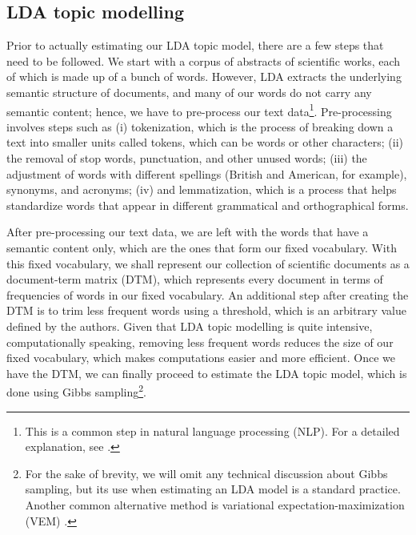 \subsection{LDA topic modelling} \label{topic_modelling}

Prior to actually estimating our LDA topic model, there are a few steps that need to be followed. We start with a corpus of abstracts of scientific works, each of which is made up of a bunch of words. However, LDA extracts the underlying semantic structure of documents, and many of our words do not carry any semantic content; hence, we have to pre-process our text data\footnote{This is a common step in natural language processing (NLP). For a detailed explanation, see \cite[p. 9-12]{ponweiser_latent_2012}.}. Pre-processing involves steps such as (i) tokenization, which is the process of breaking down a text into smaller units called tokens, which can be words or other characters; (ii) the removal of stop words, punctuation, and other unused words; (iii) the adjustment of words with different spellings (British and American, for example), synonyms, and acronyms; (iv) and lemmatization, which is a process that helps standardize words that appear in different grammatical and orthographical forms. 

After pre-processing our text data, we are left with the words that have a semantic content only, which are the ones that form our fixed vocabulary. With this fixed vocabulary, we shall represent our collection of scientific documents as a document-term matrix (DTM), which represents every document in terms of frequencies of words in our fixed vocabulary. An additional step after creating the DTM is to trim less frequent words using a threshold, which is an arbitrary value defined by the authors. Given that LDA topic modelling is quite intensive, computationally speaking, removing less frequent words reduces the size of our fixed vocabulary, which makes computations easier and more efficient. Once we have the DTM, we can finally proceed to estimate the LDA topic model, which is done using Gibbs sampling\footnote{For the sake of brevity, we will omit any technical discussion about Gibbs sampling, but its use when estimating an LDA model is a standard practice. Another common alternative method is variational expectation-maximization (VEM) \citep{grun_topicmodels_2011}.}.

